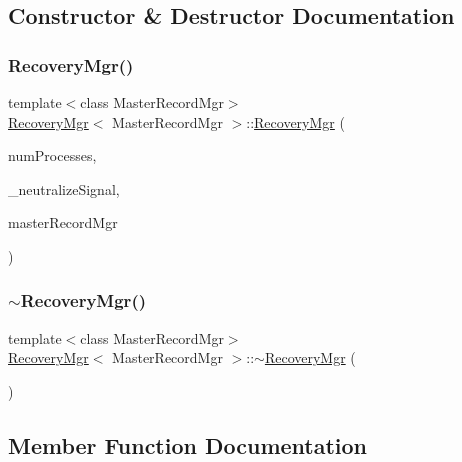 \subsection{Constructor \& Destructor Documentation}
\mbox{\label{classRecoveryMgr_a303ad058a7752d20fdc5c437d6576e1a}} 
\subsubsection{\texorpdfstring{Recovery\+Mgr()}{RecoveryMgr()}}
{\footnotesize\ttfamily template$<$class Master\+Record\+Mgr$>$ \\
\hyperlink{classRecoveryMgr}{Recovery\+Mgr}$<$ Master\+Record\+Mgr $>$\+::\hyperlink{classRecoveryMgr}{Recovery\+Mgr} (\begin{DoxyParamCaption}\item[{const int}]{num\+Processes,  }\item[{const int}]{\+\_\+neutralize\+Signal,  }\item[{Master\+Record\+Mgr $\ast$const}]{master\+Record\+Mgr }\end{DoxyParamCaption})\hspace{0.3cm}{\ttfamily [inline]}}

\mbox{\label{classRecoveryMgr_a436371a5d4bfaafd37611e842cb10c9a}} 
\subsubsection{\texorpdfstring{$\sim$\+Recovery\+Mgr()}{~RecoveryMgr()}}
{\footnotesize\ttfamily template$<$class Master\+Record\+Mgr$>$ \\
\hyperlink{classRecoveryMgr}{Recovery\+Mgr}$<$ Master\+Record\+Mgr $>$\+::$\sim$\hyperlink{classRecoveryMgr}{Recovery\+Mgr} (\begin{DoxyParamCaption}{ }\end{DoxyParamCaption})\hspace{0.3cm}{\ttfamily [inline]}}



\subsection{Member Function Documentation}
\mbox{\label{classRecoveryMgr_a80eeb52e1d5658291f244ffe43b55b50}} 
